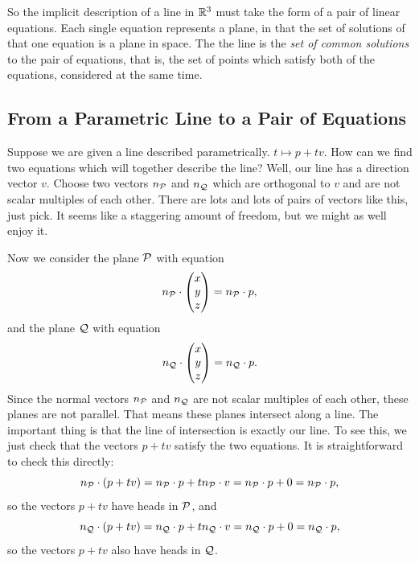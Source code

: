 \documentclass[00-livre-main.tex]{subfiles}
\begin{document}
So the implicit description of a line in $\mathbb{R}^3$ must take the form of a pair of linear equations. Each single equation represents a plane, in that the set of solutions of that one equation is a plane in space. The the line is the \emph{set of common solutions} to the pair of equations, that is, the set of points which satisfy both of the equations, considered at the same time.


\subsection*{From a Parametric Line to a Pair of Equations}

Suppose we are given a line described parametrically. $t \mapsto p + tv$.
How can we find two equations which will together describe the line? Well, our line has a direction vector $v$. Choose two vectors $n_{\mathcal{P}}$ and $n_{\mathcal{Q}}$ which are orthogonal to $v$ and are not scalar multiples of each other. There are lots and lots of pairs of vectors like this, just pick. It seems like a staggering amount of freedom, but we might as well enjoy it.

Now we consider the plane $\mathcal{P}$ with equation
\[
n_{\mathcal{P}} \cdot  \begin{pmatrix} x \\ y \\ z \end{pmatrix}  = n_{\mathcal{P}}\cdot p ,
\]
and the plane $\mathcal{Q}$ with equation
\[
n_{\mathcal{Q}} \cdot  \begin{pmatrix} x \\ y \\ z \end{pmatrix}  = n_{\mathcal{Q}}\cdot p .
\]
Since the normal vectors $n_{\mathcal{P}}$ and $n_{\mathcal{Q}}$ are not scalar multiples of each other, these planes are not parallel. That means these planes intersect along a line. The important thing is that the line of intersection is exactly our line. To see this, we just check that the vectors $p+t v$ satisfy the two equations. It is straightforward to check this directly:
\[
n_{\mathcal{P}} \cdot (p + tv) = n_{\mathcal{P}} \cdot p + t n_{\mathcal{P}}\cdot v = n_{\mathcal{P}}\cdot p + 0 = n_{\mathcal{P}}\cdot p,
\]
so the vectors $p+tv$ have heads in $\mathcal{P}$, and 
\[
n_{\mathcal{Q}} \cdot (p + tv) = n_{\mathcal{Q}} \cdot p + t n_{\mathcal{Q}}\cdot v = n_{\mathcal{Q}}\cdot p + 0 = n_{\mathcal{Q}}\cdot p,
\]
so the vectors $p+tv$ also have heads in $\mathcal{Q}$.
\end{document}
